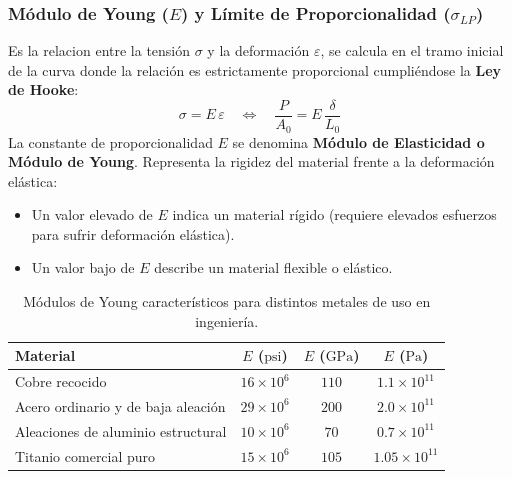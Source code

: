 \subsubsection{Módulo de Young ($E$) y Límite de Proporcionalidad ($\sigma_{LP}$)}
Es la relacion entre la tensión $\sigma$ y la deformación $\varepsilon$, se calcula en el tramo inicial de la curva donde la relación es estrictamente proporcional cumpliéndose la \textbf{Ley de Hooke}:
\begin{equation}
    \sigma = E \, \varepsilon \quad \Longleftrightarrow \quad \frac{P}{A_0} = E \, \frac{\delta}{L_0}
    \label{eq:hooke_law}
\end{equation}
La constante de proporcionalidad $E$ se denomina \textbf{Módulo de Elasticidad o Módulo de Young}. Representa la rigidez del material frente a la deformación elástica:
\begin{itemize}
    \item Un valor elevado de $E$ indica un material rígido (requiere elevados esfuerzos para sufrir deformación elástica).
    \item Un valor bajo de $E$ describe un material flexible o elástico.
\end{itemize}

\begin{table}[H]
    \centering
    \begin{tabular}{lccc}
        \toprule
        \textbf{Material}                  & \textbf{$E$ ($\text{psi}$)} & \textbf{$E$ ($\text{GPa}$)} & \textbf{$E$ ($\text{Pa}$)} \\
        \midrule
        Cobre recocido                     & $16 \times 10^6$            & $110$                       & $1.1 \times 10^{11}$       \\
        Acero ordinario y de baja aleación & $29 \times 10^6$            & $200$                       & $2.0 \times 10^{11}$       \\
        Aleaciones de aluminio estructural & $10 \times 10^6$            & $70$                        & $0.7 \times 10^{11}$       \\
        Titanio comercial puro             & $15 \times 10^6$            & $105$                       & $1.05 \times 10^{11}$      \\
        \bottomrule
    \end{tabular}
    \caption{Módulos de Young característicos para distintos metales de uso en ingeniería.}
    \label{tab:modulos_young}
\end{table}

